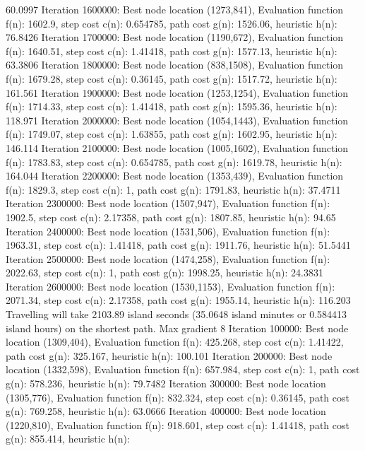 \begin{DoxyCode}
       60.0997
Iteration 1600000: Best node location (1273,841), 
     Evaluation function f(n): 1602.9, step cost c(n): 0.654785, path cost g(n): 1526.06, heuristic h(n):
       76.8426
Iteration 1700000: Best node location (1190,672), 
     Evaluation function f(n): 1640.51, step cost c(n): 1.41418, path cost g(n): 1577.13, heuristic h(n):
       63.3806
Iteration 1800000: Best node location (838,1508), 
     Evaluation function f(n): 1679.28, step cost c(n): 0.36145, path cost g(n): 1517.72, heuristic h(n):
       161.561
Iteration 1900000: Best node location (1253,1254), 
     Evaluation function f(n): 1714.33, step cost c(n): 1.41418, path cost g(n): 1595.36, heuristic h(n):
       118.971
Iteration 2000000: Best node location (1054,1443), 
     Evaluation function f(n): 1749.07, step cost c(n): 1.63855, path cost g(n): 1602.95, heuristic h(n):
       146.114
Iteration 2100000: Best node location (1005,1602), 
     Evaluation function f(n): 1783.83, step cost c(n): 0.654785, path cost g(n): 1619.78, heuristic h(n):
       164.044
Iteration 2200000: Best node location (1353,439), 
     Evaluation function f(n): 1829.3, step cost c(n): 1, path cost g(n): 1791.83, heuristic h(n): 37.4711
Iteration 2300000: Best node location (1507,947), 
     Evaluation function f(n): 1902.5, step cost c(n): 2.17358, path cost g(n): 1807.85, heuristic h(n):
       94.65
Iteration 2400000: Best node location (1531,506), 
     Evaluation function f(n): 1963.31, step cost c(n): 1.41418, path cost g(n): 1911.76, heuristic h(n):
       51.5441
Iteration 2500000: Best node location (1474,258), 
     Evaluation function f(n): 2022.63, step cost c(n): 1, path cost g(n): 1998.25, heuristic h(n): 24.3831
Iteration 2600000: Best node location (1530,1153), 
     Evaluation function f(n): 2071.34, step cost c(n): 2.17358, path cost g(n): 1955.14, heuristic h(n):
       116.203
Travelling will take 2103.89 island seconds (35.0648 island minutes or 0.584413 island hours) on the
       shortest path. 
Max gradient 8
Iteration 100000: Best node location (1309,404), 
     Evaluation function f(n): 425.268, step cost c(n): 1.41422, path cost g(n): 325.167, heuristic h(n):
       100.101
Iteration 200000: Best node location (1332,598), 
     Evaluation function f(n): 657.984, step cost c(n): 1, path cost g(n): 578.236, heuristic h(n): 79.7482
Iteration 300000: Best node location (1305,776), 
     Evaluation function f(n): 832.324, step cost c(n): 0.36145, path cost g(n): 769.258, heuristic h(n):
       63.0666
Iteration 400000: Best node location (1220,810), 
     Evaluation function f(n): 918.601, step cost c(n): 1.41418, path cost g(n): 855.414, heuristic h(n):

\end{DoxyCode}
